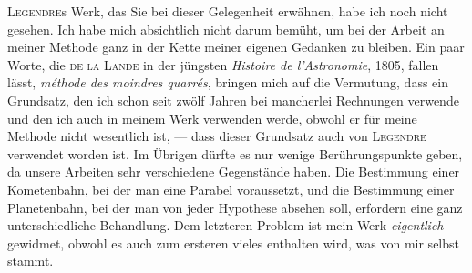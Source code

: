 \par\indent \textsc{Legendre}s Werk, das Sie bei dieser Gelegenheit erwähnen, habe ich noch nicht gesehen. Ich habe mich absichtlich nicht darum bemüht, um bei der Arbeit an meiner Methode ganz in der Kette meiner eigenen Gedanken zu bleiben. Ein paar Worte, die \textsc{de la Lande} in der jüngsten \emph{Histoire de l'Astronomie}, 1805, fallen lässt, \emph{méthode des moindres quarrés}, bringen mich auf die Vermutung, dass ein Grundsatz, den ich schon seit zwölf Jahren bei mancherlei Rechnungen verwende und den ich auch in meinem Werk verwenden werde, obwohl er für meine Methode nicht wesentlich ist, --- dass dieser Grundsatz auch von \textsc{Legendre} verwendet worden ist. Im Übrigen dürfte es nur wenige Berührungspunkte geben, da unsere Arbeiten sehr verschiedene Gegenstände haben. Die Bestimmung einer Kometenbahn, bei der man eine Parabel voraussetzt, und die Bestimmung einer Planetenbahn, bei der man von jeder Hypothese absehen soll, erfordern eine ganz unterschiedliche Behandlung. Dem letzteren Problem ist mein Werk \emph{eigentlich} gewidmet, obwohl es auch zum ersteren vieles enthalten wird, was von mir selbst stammt.


